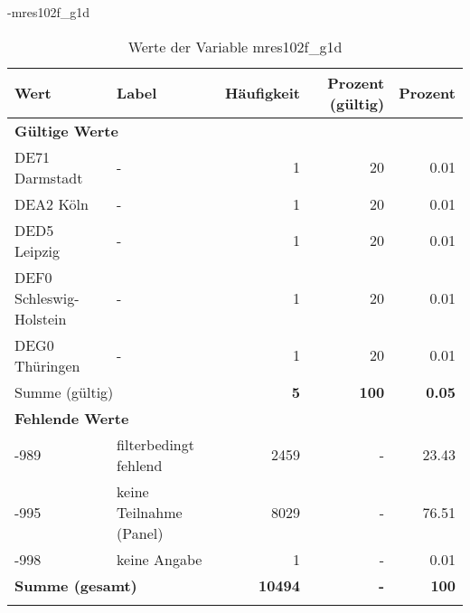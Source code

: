                 \vspace*{-\baselineskip}
					\begin{filecontents}{\jobname-mres102f_g1d}
					\begin{longtable}{Xlrrr}
					\toprule
					\textbf{Wert} & \textbf{Label} & \textbf{Häufigkeit} & \textbf{Prozent (gültig)} & \textbf{Prozent} \\
					\endhead
					\midrule
					\multicolumn{5}{l}{\textbf{Gültige Werte}}\\

					\multicolumn{1}{X}{DE71 Darmstadt} &
					- &
					\num{1} &
					\num[round-mode=places,round-precision=2]{20} &
					\num[round-mode=places,round-precision=2]{0.01} \\
					
					\multicolumn{1}{X}{DEA2 Köln} &
					- &
					\num{1} &
					\num[round-mode=places,round-precision=2]{20} &
					\num[round-mode=places,round-precision=2]{0.01} \\
					
					\multicolumn{1}{X}{DED5 Leipzig} &
					- &
					\num{1} &
					\num[round-mode=places,round-precision=2]{20} &
					\num[round-mode=places,round-precision=2]{0.01} \\
					
					\multicolumn{1}{X}{DEF0 Schleswig-Holstein} &
					- &
					\num{1} &
					\num[round-mode=places,round-precision=2]{20} &
					\num[round-mode=places,round-precision=2]{0.01} \\
					
					\multicolumn{1}{X}{DEG0 Thüringen} &
					- &
					\num{1} &
					\num[round-mode=places,round-precision=2]{20} &
					\num[round-mode=places,round-precision=2]{0.01} \\
					\midrule
						\multicolumn{2}{l}{Summe (gültig)} & \textbf{\num{5}} &
						\textbf{\num{100}} &
					    \textbf{\num[round-mode=places,round-precision=2]{0.05}} \\
					\multicolumn{5}{l}{\textbf{Fehlende Werte}}\\
							-989 & filterbedingt fehlend & \num{2459} & - & \num[round-mode=places,round-precision=2]{23.43} \\

							-995 & keine Teilnahme (Panel) & \num{8029} & - & \num[round-mode=places,round-precision=2]{76.51} \\

							-998 & keine Angabe & \num{1} & - & \num[round-mode=places,round-precision=2]{0.01} \\

					\midrule
					\multicolumn{2}{l}{\textbf{Summe (gesamt)}} & \textbf{\num{10494}} & \textbf{-} & \textbf{\num{100}} \\
					\bottomrule
					\caption{Werte der Variable mres102f\_g1d}
					\end{longtable}
					\end{filecontents}

